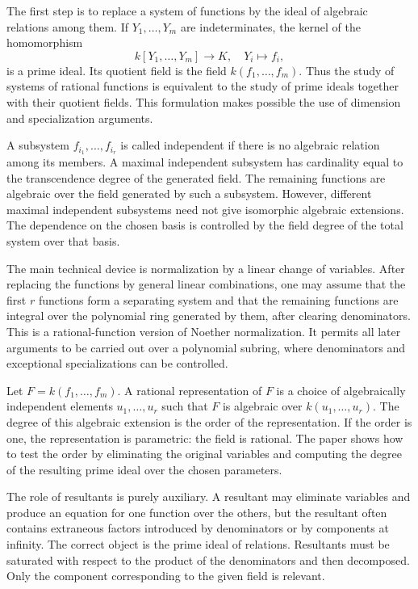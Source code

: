 \documentclass[11pt]{article}
\begin{document}
The first step is to replace a system of functions by the ideal of algebraic relations among them.
If \(Y_1, \ldots,Y_m\) are indeterminates, the kernel of the homomorphism \[
k[Y_1,\ldots,Y_m]\longrightarrow K,   \quad Y_i\mapsto f_i, \] is a prime ideal. Its quotient field
is the field \(k(f_1, \ldots,f_m)\). Thus the study of systems of rational functions is equivalent
to the study of prime ideals together with their quotient fields. This formulation makes possible
the use of dimension and specialization arguments.


A subsystem \(f_{i_1}, \ldots,f_{i_r}\) is called independent if there is no algebraic relation
among its members. A maximal independent subsystem has cardinality equal to the transcendence degree
of the generated field. The remaining functions are algebraic over the field generated by such a
subsystem. However, different maximal independent subsystems need not give isomorphic algebraic
extensions. The dependence on the chosen basis is controlled by the field degree of the total system
over that basis.


The main technical device is normalization by a linear change of variables. After replacing the
functions by general linear combinations, one may assume that the first \(r\) functions form a
separating system and that the remaining functions are integral over the polynomial ring generated
by them, after clearing denominators. This is a rational-function version of Noether normalization.
It permits all later arguments to be carried out over a polynomial subring, where denominators and
exceptional specializations can be controlled.


Let \(F=k(f_1, \ldots,f_m)\). A rational representation of \(F\) is a choice of algebraically
independent elements \(u_1, \ldots,u_r\) such that \(F\) is algebraic over \(k(u_1, \ldots,u_r)\).
The degree of this algebraic extension is the order of the representation. If the order is one, the
representation is parametric: the field is rational. The paper shows how to test the order by
eliminating the original variables and computing the degree of the resulting prime ideal over the
chosen parameters.


The role of resultants is purely auxiliary. A resultant may eliminate variables and produce an
equation for one function over the others, but the resultant often contains extraneous factors
introduced by denominators or by components at infinity. The correct object is the prime ideal of
relations. Resultants must be saturated with respect to the product of the denominators and then
decomposed. Only the component corresponding to the given field is relevant.
\end{document}
